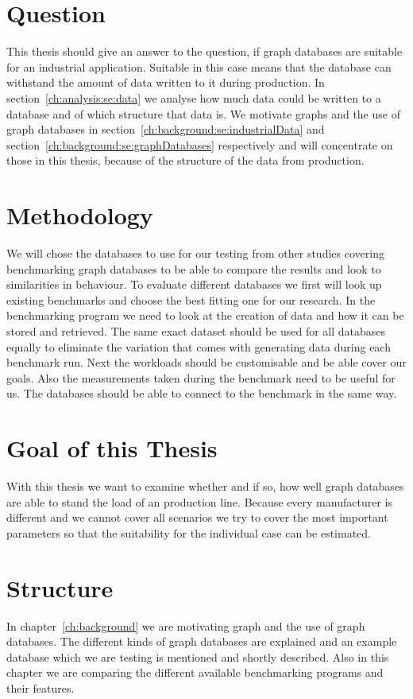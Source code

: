 \section{Question}
This thesis should give an answer to the question, if graph databases are suitable for an industrial application.
Suitable in this case means that the database can withstand the amount of data written to it during production.
In section~\ref{ch:analysis:se:data} we analyse how much data could be written to a database and of which structure that data is.
We motivate graphs and the use of graph databases in section~\ref{ch:background:se:industrialData} and section~\ref{ch:background:se:graphDatabases} respectively and will concentrate on those in this thesis,
because of the structure of the data from production.

\section{Methodology}
We will chose the databases to use for our testing from other studies covering benchmarking graph databases to be able to compare the results and look to similarities in behaviour.
To evaluate different databases we first will look up existing benchmarks and choose the best fitting one for our research.
In the benchmarking program we need to look at the creation of data and how it can be stored and retrieved.
The same exact dataset should be used for all databases equally to eliminate the variation that comes with generating data during each benchmark run.
Next the workloads should be customisable and be able cover our goals.
Also the measurements taken during the benchmark need to be useful for us.
The databases should be able to connect to the benchmark in the same way.

\section{Goal of this Thesis}
With this thesis we want to examine whether and if so,
how well graph databases are able to stand the load of an production line.
Because every manufacturer is different and we cannot cover all scenarios we try to cover the most important parameters
so that the suitability for the individual case can be estimated.

\section{Structure}
In chapter~\ref{ch:background} we are motivating graph and the use of graph databases.
The different kinds of graph databases are explained and an example database which we are testing is mentioned and shortly described.
Also in this chapter we are comparing the different available benchmarking programs and their features.

